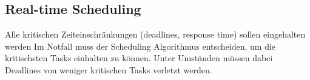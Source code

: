 \subsection{Real-time Scheduling}

\begin{outline}
    \1 Alle kritischen Zeiteinschränkungen (deadlines, response time) sollen eingehalten werden
    \1 Im Notfall muss der Scheduling Algorithmus entscheiden, um die kritischsten Tasks einhalten zu können.
        \2 Unter Umständen müssen dabei Deadlines von weniger kritischen Tasks verletzt werden.
\end{outline}

